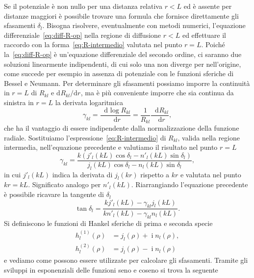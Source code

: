 \documentclass[a4paper,fleqn,twoside,12pt]{article}
\newcommand*{\dd}{\mathop{}\!\mathrm{d}} %
\DeclareMathOperator{\uimm}{\mathrm{i}} %
\newcommand*{\toder}[3][]{\frac{{\dd^{#1}}#2}{\dd {#3}^{#1}}}
\newcommand*{\ltoder}[3][]{\mathrm{d}^{#1}#2 / \mathrm{d} {#3}^{#1}}
\begin{document}
Se il potenziale è non nullo per una distanza relativa $r < L$ ed è assente per
distanze maggiori è possibile trovare una formula che fornisce direttamente gli
sfasamenti $\delta_{l}$.  Bisogna risolvere, eventualmente con metodi numerici,
l'equazione differenziale~\eqref{eq:diff-R-op} nella regione di diffusione
$r < L$ ed effettuare il raccordo con la forma~\eqref{eq:R-intermedio} valutata
nel punto $r = L$.  Poiché la~\eqref{eq:diff-R-op} è un'equazione differenziale
del secondo ordine, ci saranno due soluzioni linearmente indipendenti, di cui
solo una non diverge per nell'origine, come succede per esempio in assenza di
potenziale con le funzioni sferiche di Bessel e Neumann.  Per determinare gli
sfasamenti possiamo imporre la continuità in $r=L$ di $R_{kl}$ e
$\ltoder{R_{kl}}{r}$, ma è più conveniente imporre che sia continua da sinistra
in $r=L$ la derivata logaritmica
\begin{equation}
  \gamma_{kl} = \toder{\log R_{kl}}{r} = \frac{1}{R_{kl}} \toder{R_{kl}}{r},
\end{equation}
che ha il vantaggio di essere indipendente dalla normalizzazione della funzione
radiale.  Sostituiamo l'espressione~\eqref{eq:R-intermedio} di $R_{kl}$, valida
nella regione intermedia, nell'equazione precedente e valutiamo il risultato nel
punto $r = L$
\begin{equation}
  \gamma_{kl} = \frac{k(j'_{l}(kL)\cos\delta_{l} -
    n'_{l}(kL)\sin\delta_{l})}{j_{l}(kL)\cos\delta_{l} -
    n_{l}(kL)\sin\delta_{l}},
\end{equation}
in cui $j'_{l}(kL)$ indica la derivata di $j_{l}(kr)$ rispetto a $kr$ e valutata
nel punto $kr = kL$.  Significato analogo per $n'_{l}(kL)$.  Riarrangiando
l'equazione precedente è possibile ricavare la tangente di $\delta_{l}$
\begin{equation}
  \label{eq:tangente-sfasamento}
  \tan\delta_{l} = \frac{kj'_{l}(kL) - \gamma_{kl}j_{l}(kL)}{kn'_{l}(kL) -
    \gamma_{kl}n_{l}(kL)}.
\end{equation}
Si definiscono le funzioni di Hankel sferiche di prima e seconda specie
\begin{subequations}
  \begin{align}
    h_{l}^{(1)}(\rho) &= j_{l}(\rho) + \uimm n_{l}(\rho), \\
    h_{l}^{(2)}(\rho) &= j_{l}(\rho) - \uimm n_{l}(\rho)
  \end{align}
\end{subequations}
e vediamo come possono essere utilizzate per calcolare gli sfasamenti.  Tramite
gli sviluppi in esponenziali delle funzioni seno e coseno si trova la seguente
\end{document}
